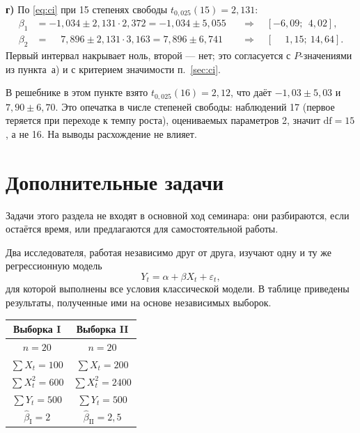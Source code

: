 \begin{solution}
\medskip
\textbf{г)} По \eqref{eq:ci} при 15 степенях свободы $t_{0{,}025}(15) = 2{,}131$:
\[
\begin{aligned}
  \beta_1 &= -1{,}034 \pm 2{,}131 \cdot 2{,}372 = -1{,}034 \pm 5{,}055
          &&\Longrightarrow\quad [-6{,}09;\ \ 4{,}02], \\[2pt]
  \beta_2 &= \phantom{-}7{,}896 \pm 2{,}131 \cdot 3{,}163 = 7{,}896 \pm 6{,}741
          &&\Longrightarrow\quad [\phantom{-}1{,}15;\ 14{,}64].
\end{aligned}
\]
Первый интервал накрывает ноль, второй — нет; это согласуется с $P$-значениями
из пункта~а) и с критерием значимости п.~\ref{sec:ci}.

\begin{remark}
В решебнике в этом пункте взято $t_{0{,}025}(16) = 2{,}12$, что даёт
$-1{,}03 \pm 5{,}03$ и $7{,}90 \pm 6{,}70$. Это опечатка в числе степеней свободы:
наблюдений 17 (первое теряется при переходе к темпу роста), оцениваемых
параметров 2, значит $\mathrm{df} = 15$, а не 16. На выводы расхождение не влияет.
\end{remark}
\end{solution}

\section{Дополнительные задачи}

Задачи этого раздела не входят в основной ход семинара: они разбираются, если
остаётся время, или предлагаются для самостоятельной работы.


Два исследователя, работая независимо друг от друга, изучают одну и ту же
регрессионную модель
\[
  Y_t = \alpha + \beta X_t + \varepsilon_t,
\]
для которой выполнены все условия классической модели. В таблице приведены
результаты, полученные ими на основе независимых выборок.

\begin{center}
\begin{tabular}{cc}
\toprule
Выборка I & Выборка II \\
\midrule
$n = 20$              & $n = 20$ \\
$\sum X_t = 100$      & $\sum X_t = 200$ \\
$\sum X_t^2 = 600$    & $\sum X_t^2 = 2400$ \\
$\sum Y_t = 500$      & $\sum Y_t = 500$ \\
$\widehat{\beta}_{\mathrm{I}} = 2$ & $\widehat{\beta}_{\mathrm{II}} = 2{,}5$ \\
\bottomrule
\end{tabular}
\end{center}

